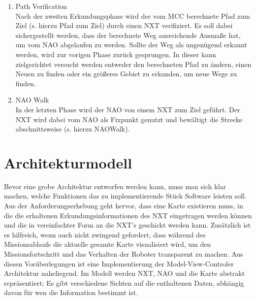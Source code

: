 \begin{enumerate}
\item Path Verification\\
Nach der zweiten Erkundungsphase wird der vom MCC berechnete Pfad zum Ziel (s. hierzu Pfad zum Ziel) durch einen NXT verifiziert. Es soll dabei sichergestellt werden, dass der berechnete Weg ausreichende Ausmaße hat, um vom NAO abgelaufen zu werden. Sollte der Weg als ungenügend erkannt werden, wird zur vorigen Phase zurück gesprungen. In dieser kann zielgerichtet versucht werden entweder den berechneten Pfad zu ändern, einen Neuen zu finden oder ein größeres Gebiet zu erkunden, um neue Wege zu finden.

\item NAO Walk\\
In der letzten Phase wird der NAO von einem NXT zum Ziel geführt. Der NXT wird dabei vom NAO als Fixpunkt genutzt und bewältigt die Strecke abschnittsweise (s. hierzu NAOWalk).
\end{enumerate}

\section{Architekturmodell}
Bevor eine grobe Architektur entworfen werden kann, muss man sich klar machen, welche Funktionen das zu implementierende Stück Software leisten soll. Aus der Anforderungserhebung geht hervor, dass eine Karte existieren muss, in die die erhaltenen Erkundungsinformationen des NXT eingetragen werden können und die in vereinfachter Form an die NXT's geschickt werden kann. Zusätzlich ist es hilfreich, wenn auch nicht zwingend gefordert, dass während des Missionsablaufs die aktuelle gesamte Karte visualisiert wird, um den Missionsfortschritt und das Verhalten der Roboter transparent zu machen.
Aus diesen Vorüberlegungen ist eine Implementierung der Model-View-Controler Architektur naheliegend. Im Modell werden NXT, NAO und die Karte abstrakt repräsentiert; Es gibt verschiedene Sichten auf die enthaltenen Daten, abhängig davon für wen die Information bestimmt ist.

